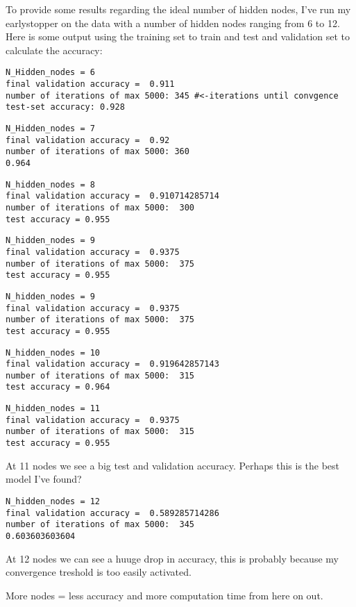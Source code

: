 \documentclass[10pt, a4paper]{article}
\begin{document}
To provide some results regarding the ideal number of hidden nodes, I've run my earlystopper on the data with a number of hidden nodes ranging from 6 to 12.
Here is some output using the training set to train and test and validation set to calculate the accuracy:

\begin{lstlisting}
N_Hidden_nodes = 6
final validation accuracy =  0.911
number of iterations of max 5000: 345 #<-iterations until convgence
test-set accuracy: 0.928
\end{lstlisting}
\begin{lstlisting}
N_Hidden_nodes = 7
final validation accuracy =  0.92
number of iterations of max 5000: 360
0.964
\end{lstlisting}
\begin{lstlisting}
N_hidden_nodes = 8
final validation accuracy =  0.910714285714
number of iterations of max 5000:  300
test accuracy = 0.955
\end{lstlisting}

\begin{lstlisting}
N_hidden_nodes = 9
final validation accuracy =  0.9375
number of iterations of max 5000:  375
test accuracy = 0.955
\end{lstlisting}

\begin{lstlisting}
N_hidden_nodes = 9
final validation accuracy =  0.9375
number of iterations of max 5000:  375
test accuracy = 0.955
\end{lstlisting}
\begin{lstlisting}
N_hidden_nodes = 10
final validation accuracy =  0.919642857143
number of iterations of max 5000:  315
test accuracy = 0.964
\end{lstlisting}

\begin{lstlisting}
N_hidden_nodes = 11
final validation accuracy =  0.9375
number of iterations of max 5000:  315
test accuracy = 0.955
\end{lstlisting}
At 11 nodes we see a big test and validation accuracy. Perhaps this is the best model I've found?
\begin{lstlisting}
N_hidden_nodes = 12
final validation accuracy =  0.589285714286
number of iterations of max 5000:  345
0.603603603604
\end{lstlisting}
At 12 nodes we can see a huuge drop in accuracy, this is probably because my convergence treshold is too easily activated.

More nodes = less accuracy and more computation time from here on out.
\end{document}
